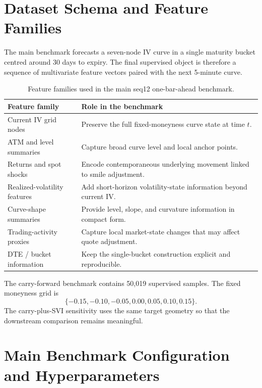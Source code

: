 \documentclass[12pt]{report}
\begin{document}
\appendix

\chapter{Dataset Schema and Feature Families}
The main benchmark forecasts a seven-node IV curve in a single maturity bucket centred around 30 days to expiry. The final supervised object is therefore a sequence of multivariate feature vectors paired with the next 5-minute curve.

\begin{table}[H]
\centering
\caption{Feature families used in the main seq12 one-bar-ahead benchmark.}
\footnotesize
\renewcommand{\arraystretch}{1.15}
\begin{tabularx}{\textwidth}{@{}lY@{}}
\toprule
\textbf{Feature family} & \textbf{Role in the benchmark} \\
\midrule
Current IV grid nodes & Preserve the full fixed-moneyness curve state at time \(t\). \\
ATM and level summaries & Capture broad curve level and local anchor points. \\
Returns and spot shocks & Encode contemporaneous underlying movement linked to smile adjustment. \\
Realized-volatility features & Add short-horizon volatility-state information beyond current IV. \\
Curve-shape summaries & Provide level, slope, and curvature information in compact form. \\
Trading-activity proxies & Capture local market-state changes that may affect quote adjustment. \\
DTE / bucket information & Keep the single-bucket construction explicit and reproducible. \\
\bottomrule
\end{tabularx}
\end{table}

The carry-forward benchmark contains 50,019 supervised samples. The fixed moneyness grid is
\[
\{-0.15,-0.10,-0.05,0.00,0.05,0.10,0.15\}.
\]
The carry-plus-SVI sensitivity uses the same target geometry so that the downstream comparison remains meaningful.

\chapter{Main Benchmark Configuration and Hyperparameters}
\end{document}
